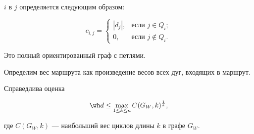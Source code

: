 $i$ в $j$ определяeтся следующим образом:


$$


c_{i,j}=


\begin{cases}


|d_j|, & \text{если } j \in Q_i;\\


0, & \text{если } j \notin Q_i.


\end{cases}


$$


Это полный ориентированный граф с петлями.


Определим вес маршрута как произведение весов всех дуг, входящих в маршрут.





\begin{thm} Справедлива оценка


\begin{equation} \label{dcicle}


\wh d \le \max_{1 \le k \le n} C(G_W,k)^{\frac{1}{k}},


\end{equation}


где $ C(G_W,k) $ --- наибольший вес циклов длины $k$ в графе $ G_W $.


\end{thm}





